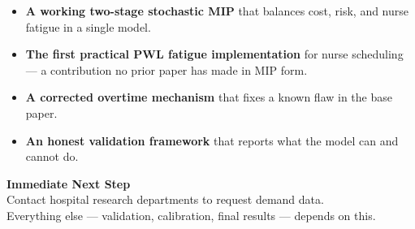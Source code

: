 \documentclass[12pt,a4paper]{article}
\begin{document}
\begin{contribbox}
\begin{itemize}[itemsep=5pt]
  \item \textbf{A working two-stage stochastic MIP} that balances cost, risk, and nurse fatigue in a single model.
  \item \textbf{The first practical PWL fatigue implementation} for nurse scheduling — a contribution no prior paper has made in MIP form.
  \item \textbf{A corrected overtime mechanism} that fixes a known flaw in the base paper.
  \item \textbf{An honest validation framework} that reports what the model can and cannot do.
\end{itemize}
\end{contribbox}

\vspace{10pt}
\begin{center}
  \begin{tcolorbox}[
    enhanced, width=0.85\textwidth,
    colback=navyblue, colframe=accentcyan,
    arc=8pt, boxrule=2pt,
    halign=center
  ]
    {\large\bfseries\color{white} Immediate Next Step}\\[6pt]
    {\color{skyblue}
      Contact hospital research departments to request demand data.\\
      Everything else — validation, calibration, final results — depends on this.}
  \end{tcolorbox}
\end{center}
\end{document}
